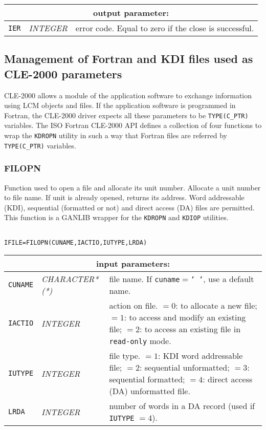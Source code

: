 \vskip 0.4cm
\goodbreak
\noindent
\begin{tabular}{|p{1.5cm}|p{3cm}|p{10cm}|}
\hline
\multicolumn{3}{|c|}{\bf output parameter:} \\
\hline
{\tt IER} & {\it INTEGER}  & error code. Equal to zero if the close is successful.  \\
\hline
\end{tabular}

\vskip 0.8cm

\subsection {Management of Fortran and KDI files used as CLE-2000 parameters}

CLE-2000 allows a module of the application software to exchange information using LCM objects and files. If the
application software is programmed in Fortran, the CLE-2000 driver expects all these parameters to be {\tt TYPE(C\_PTR)}
variables. The ISO Fortran CLE-2000 API defines a collection of four functions to wrap the {\tt KDROPN} utility
in such a way that Fortran files are  referred by {\tt TYPE(C\_PTR)} variables.

\subsubsection{FILOPN}

Function used to open a file and allocate its unit number. Allocate a unit number to file
name. If unit is already opened, returns its address. Word addressable (KDI), sequential (formatted
or not) and direct access (DA) files are permitted.
This function is a GANLIB wrapper for the {\tt KDROPN} and {\tt KDIOP} utilities.

\begin{verbatim}

IFILE=FILOPN(CUNAME,IACTIO,IUTYPE,LRDA)
\end{verbatim}

\noindent
\begin{tabular}{|p{1.5cm}|p{3cm}|p{10cm}|}
\hline
\multicolumn{3}{|c|}{\bf input parameters:} \\
\hline
{\tt CUNAME} & {\it CHARACTER*(*)}  &  file name. If {\tt cuname}$=${\tt ' '}, use a default name. \\
\hline
{\tt IACTIO} & {\it INTEGER}  & action on file.
$=0$: to allocate a new file;
$=1$: to access and modify an existing file;
$=2$: to access an existing file in {\tt read-only} mode.  \\
\hline
{\tt IUTYPE} & {\it INTEGER}  & file type. 
$=1$:  KDI word addressable file;
$=2$:  sequential unformatted;
$=3$:  sequential formatted;
$=4$:  direct access (DA) unformatted file.  \\
\hline
{\tt LRDA} & {\it INTEGER}  & number of words in a DA record (used if {\tt IUTYPE} $= 4$).  \\
\hline
\end{tabular}

